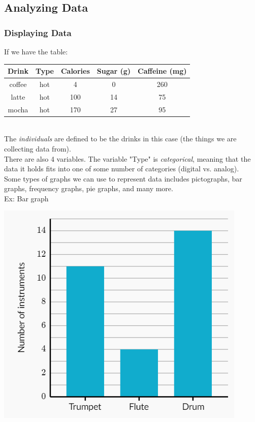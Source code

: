 \subsection{Analyzing Data}
\subsubsection{Displaying Data}
If we have the table:\\

\begin{tabular}{c|c|c|c|c}
    Drink & Type & Calories & Sugar (g) & Caffeine (mg)\\
    \hline
    coffee & hot & 4 & 0 & 260\\
    latte & hot & 100 & 14 & 75\\
    mocha & hot & 170 & 27 & 95
\end{tabular}\\
The \textit{individuals} are defined to be the drinks in this case (the things we are collecting data from).\\
There are also 4 variables. The variable "Type" is \textit{categorical}, meaning that the data it holds fits into one of some number of categories (digital vs. analog).\\
Some types of graphs we can use to represent data includes pictographs, bar graphs, frequency graphs, pie graphs, and many more.\\
Ex: Bar graph\\
\centerline{\includegraphics[scale=0.7]{Images/FundamentalsPictures/barGraph.png}}

